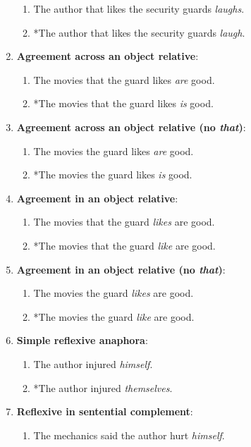 \begin{enumerate}[noitemsep]
    \begin{enumerate}
      \item The author that likes the security guards \textit{laughs}.
      \item *The author that likes the security guards \textit{laugh}.
    \end{enumerate}
  \item \textbf{Agreement across an object relative}:
    \begin{enumerate}
      \item The movies that the guard likes \textit{are} good.
      \item *The movies that the guard likes \textit{is} good.
    \end{enumerate}
  \item \textbf{Agreement across an object relative (no \textit{that})}:
    \begin{enumerate}
      \item The movies the guard likes \textit{are} good.
      \item *The movies the guard likes \textit{is} good.
    \end{enumerate}
  \item \textbf{Agreement in an object relative}:
    \begin{enumerate}
      \item The movies that the guard \textit{likes} are good.
      \item *The movies that the guard \textit{like} are good.
    \end{enumerate}
  \item \textbf{Agreement in an object relative (no \textit{that})}:
    \begin{enumerate}
      \item The movies the guard \textit{likes} are good.
      \item *The movies the guard \textit{like} are good.
    \end{enumerate}
  \item \textbf{Simple reflexive anaphora}:
    \begin{enumerate}
      \item The author injured \textit{himself}.
      \item *The author injured \textit{themselves}.
    \end{enumerate}
  \item \textbf{Reflexive in sentential complement}:
    \begin{enumerate}
      \item The mechanics said the author hurt \textit{himself}.

\end{enumerate}
\end{enumerate}
